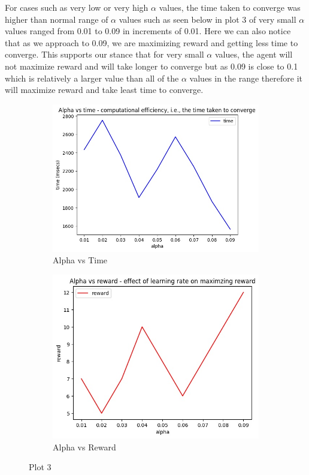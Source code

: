 \documentclass[conference]{IEEEtran}
\begin{document}
For cases such as very low or very high $\alpha$ values, the time taken to converge was higher than normal range of $\alpha$ values such as seen below in plot 3 of very small $\alpha$ values ranged from 0.01 to 0.09 in increments of 0.01. Here we can also notice that as we approach to 0.09, we are maximizing reward and getting less time to converge. This supports our stance that for very small $\alpha$ values, the agent will not maximize reward and will take longer to converge but as 0.09 is close to 0.1 which is relatively a larger value than all of the $\alpha$ values in the range therefore it will maximize reward and take least time to converge. 
\begin{figure}[htbp]
  \centering
  \begin{subfigure}[t]{0.45\linewidth}
    \includegraphics[width=\linewidth]{Plots/alpha vs time cc 1.jpg}
    \caption{Alpha vs Time}
    \label{fig:figure98}
  \end{subfigure}
  \hfill
  \begin{subfigure}[t]{0.45\linewidth}
    \includegraphics[width=\linewidth]{Plots/alpha vs reward cc 1.jpg}
    \caption{Alpha vs Reward}
    \label{fig:figure99}
  \end{subfigure}
  \caption{Plot 3}
  \label{fig:bothfigures}
\end{figure}
\end{document}

